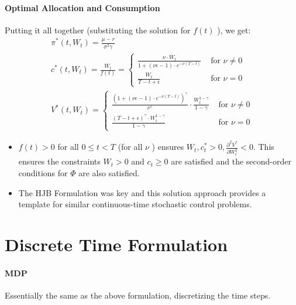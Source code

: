 \documentclass[11pt]{article}
\begin{document}
\paragraph*{Optimal Allocation and Consumption}
Putting it all together (substituting the solution for $f(t)$ ), we get:
$$
\begin{gathered}
\pi^*\left(t, W_t\right)=\frac{\mu-r}{\sigma^2 \gamma} \\
c^*\left(t, W_t\right)=\frac{W_t}{f(t)}= \begin{cases}\frac{\nu \cdot W_t}{1+(\nu \epsilon-1) \cdot e^{-\nu(T-t)}} & \text { for } \nu \neq 0 \\
\frac{W_t}{T-t+\epsilon} & \text { for } \nu=0\end{cases} \\
V^*\left(t, W_t\right)= \begin{cases}\frac{\left(1+(\nu \epsilon-1) \cdot e^{-\nu(T-t)}\right)^\gamma}{\nu^\gamma} \cdot \frac{W_t^{1-\gamma}}{1-\gamma} & \text { for } \nu \neq 0 \\
\frac{(T-t+\epsilon)^\gamma \cdot W_t^{1-\gamma}}{1-\gamma} & \text { for } \nu=0\end{cases}
\end{gathered}
$$
\begin{itemize}
    \item $f(t)>0$ for all $0 \leq t<T$ (for all $\nu$ ) ensures $W_t, c_t^*>0, \frac{\partial^2 V^*}{\partial W_t^2}<0$. This ensures the constraints $W_t>0$ and $c_t \geq 0$ are satisfied and the second-order conditions for $\Phi$ are also satisfied.
    \item The HJB Formulation was key and this solution approach provides a template for similar continuous-time stochastic control problems.
\end{itemize}

\section*{Discrete Time Formulation}
\paragraph*{MDP}
Essentially the same as the above formulation, discretizing the time steps. 
\end{document}

